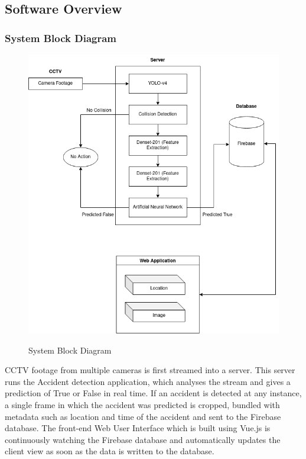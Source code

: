 \documentclass[ 12pt,a4paper,twocolumn,fleqn]{article}
\begin{document}
\begin{adjustwidth}{3.5em}{0pt}
\subsection{Software Overview}

\subsubsection{System Block Diagram}

\begin{figure}[H]
\begin{center}
    \hspace*{0.4in}
    \includegraphics[scale=0.6]{media/system_block.png}
    \centering
    \\
  \caption{ System Block Diagram}
\end{center}
\end{figure}

\newpage
  \pagestyle{fancy}

CCTV footage from multiple cameras is first streamed into a server. This server runs the Accident detection application, which analyses the stream and gives a prediction of True or False in real time. If an accident is detected at any instance, a single frame in which the accident was predicted is cropped, bundled with metadata such as location and time of the accident and sent to the Firebase database. 
The front-end Web User Interface which is built using Vue.js is continuously watching the Firebase database and automatically updates the client view as soon as the data is written to the database.


\end{adjustwidth}
\end{document}
